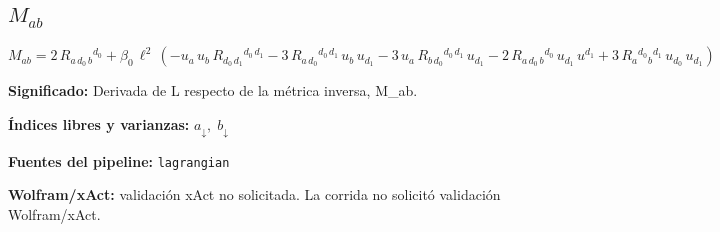 \documentclass[11pt]{article}
\begin{document}
\subsection*{$ M_{ab} $}
\begin{dmath*}[breakdepth={5}]
M_{ab} = 2\,R{}_{a\,d_{0}\,b}{}^{d_{0}} + \beta_{0}\,{\ell}^{2}\,\left(-u{}_{a}\,u{}_{b}\,R{}_{d_{0}\,d_{1}}{}^{d_{0}\,d_{1}} - 3\,R{}_{a\,d_{0}}{}^{d_{0}\,d_{1}}\,u{}_{b}\,u{}_{d_{1}} - 3\,u{}_{a}\,R{}_{b\,d_{0}}{}^{d_{0}\,d_{1}}\,u{}_{d_{1}} - 2\,R{}_{a\,d_{0}\,b}{}^{d_{0}}\,u{}_{d_{1}}\,u{}^{d_{1}} + 3\,R{}_{a}{}^{d_{0}}{}_{b}{}^{d_{1}}\,u{}_{d_{0}}\,u{}_{d_{1}}\right)
\end{dmath*}
\par\vspace{1.2\baselineskip}\noindent
\begin{minipage}{\linewidth}
\textbf{Significado:} Derivada de L respecto de la métrica inversa, M\_ab.\par
\textbf{Índices libres y varianzas:} $ a_{\downarrow},\;b_{\downarrow} $\par
\textbf{Fuentes del pipeline:} \texttt{lagrangian}\par
\textbf{Wolfram/xAct:} validación xAct no solicitada. La corrida no solicitó validación Wolfram/xAct.\par
\end{minipage}
\end{document}
